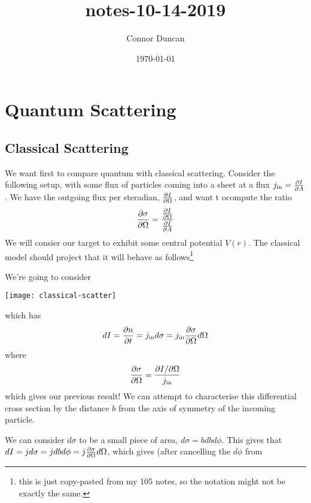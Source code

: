 \documentclass{article}
\author{Connor Duncan}
\date{\today}
\title{notes-10-14-2019}
\theoremstyle{definition}
\begin{document}
\section{Quantum Scattering} \subsection{Classical Scattering} We want first to compare quantum with classical scattering. Consider the following setup, with some flux of particles coming into a sheet at a flux $j_{\mathrm{in}}=\pdv{I}{A}$. We have the outgoing flux per steradian, $\pdv{I}{\Omega}$, and want t ocompute the ratio \begin{equation} \pdv{\sigma}{\Omega}=\frac{\pdv{I}{\Omega}}{\pdv{I}{A}} \end{equation} We will consier our target to exhibit some central potential $V(r)$. The classical model should project that it will behave as follows\footnote{this is just copy-pasted from my 105 notes, so the notation might not be exactly the same.} \begin{center}  \end{center} We're going to consider \begin{center} \texttt{[image: classical-scatter]} \end{center} which has \begin{equation} dI=\pdv{n}{t}=j_\mathrm{in}d\sigma=j_{\mathrm{in}}\pdv{\sigma}{\Omega}d\Omega \end{equation} where \begin{equation} \pdv{\sigma}{\Omega}=\frac{\partial I/\partial\Omega}{j_\mathrm{in}} \end{equation} which gives our previous result! We can attempt to characterise this differential cross section by the distance $b$ from the axis of symmetry of the incoming particle. \begin{center}  \end{center} We can consider $d\sigma$ to be a small piece of area, $d\sigma=bdbd\phi$. This gives that $dI=jd\sigma=jdbd\phi=j\pdv{\sigma}{\Omega}d\Omega$, which gives (after cancelling the $d\phi$ from 
\end{document}
